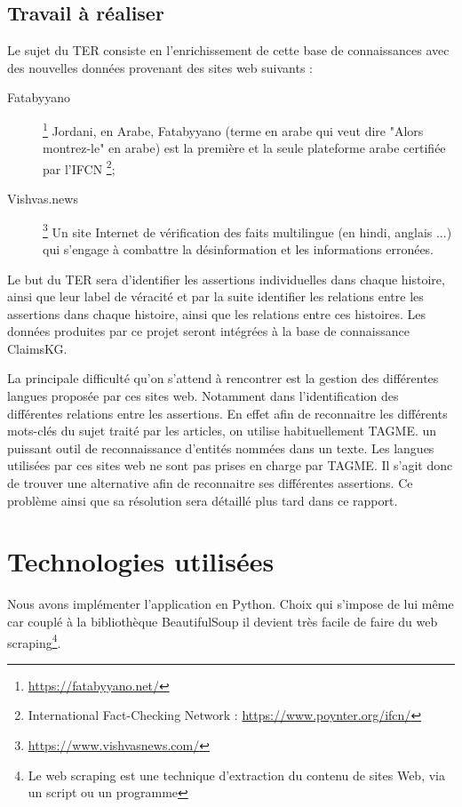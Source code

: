 \documentclass[oneside,13pt,a4paper]{report}
\begin{document}
\subsection{Travail à réaliser}

Le sujet du TER consiste en l’enrichissement de cette base de connaissances avec des nouvelles données provenant des sites web suivants :

\begin{description}
	\item[Fatabyyano]\footnote{\url{https://fatabyyano.net/}} Jordani, en Arabe, Fatabyyano (terme en arabe qui veut dire "Alors montrez-le" en arabe) est la première et la seule plateforme arabe certifiée par l'IFCN \footnote{International Fact-Checking Network : \url{https://www.poynter.org/ifcn/}};
	\item[Vishvas.news]\footnote{\url{https://www.vishvasnews.com/}} Un site Internet de vérification des faits multilingue (en hindi, anglais ...) qui s'engage à combattre la désinformation et les informations erronées.
\end{description}

Le but du TER sera d’identifier les assertions individuelles dans chaque histoire, ainsi que leur label de véracité et par la suite identifier les relations entre les assertions dans chaque histoire, ainsi que les relations entre ces histoires. Les données produites par ce projet seront intégrées à la base de connaissance ClaimsKG.

La principale difficulté qu'on s'attend à rencontrer est la gestion des différentes langues proposée par ces sites web. Notamment dans l'identification des différentes relations entre les assertions. En effet afin de reconnaitre les différents mots-clés du sujet traité par les articles, on utilise habituellement TAGME. un puissant outil de reconnaissance d'entités nommées dans un texte. Les langues utilisées par ces sites web ne sont pas prises en charge par TAGME. Il s'agit donc de trouver une alternative afin de reconnaitre ses différentes assertions. Ce problème ainsi que sa résolution sera détaillé plus tard dans ce rapport.

\section{Technologies utilisées}

Nous avons implémenter l'application en Python. Choix qui s'impose de lui même car couplé à la bibliothèque BeautifulSoup il devient très facile de faire du web scraping\footnote{Le web scraping est une technique d'extraction du contenu de sites Web, via un script ou un programme}.
\end{document}
